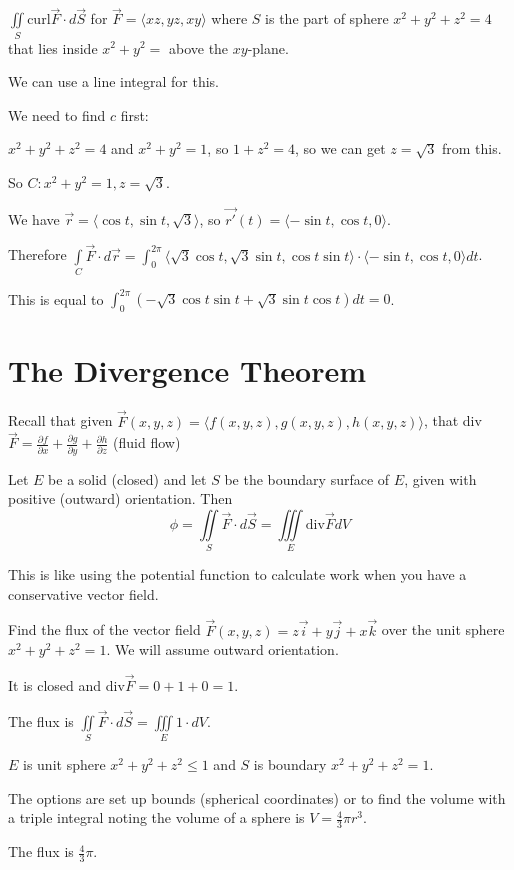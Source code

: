 \documentclass[../calc3.tex]{subfiles}
\begin{document}
\begin{example}
    $\iint\limits_{S}\text{curl}\vec{F}\cdot d\vec{S}$ for $\vec{F}=\langle xz,yz,xy\rangle$ where $S$ is the part of sphere $x^2+y^2+z^2=4$ that lies inside $x^2+y^2=$ above the $xy$-plane.

    We can use a line integral for this.

    We need to find $c$ first:

    $x^2+y^2+z^2=4$ and $x^2+y^2=1$, so $1+z^2=4$, so we can get $z=\sqrt{3}$ from this.

    So $C: x^2+y^2=1, z=\sqrt{3}$.

    We have $\vec{r}=\langle \cos t,\sin t,\sqrt{3}\rangle$, so $\vec{r'}(t)=\langle -\sin t,\cos t,0\rangle$.

    Therefore $\int\limits_{C}\vec{F}\cdot d\vec{r}=\int_0^{2\pi}\langle \sqrt{3}\cos t,\sqrt{3}\sin t,\cos t\sin t\rangle\cdot \langle -\sin t, \cos t,0\rangle dt$.

    This is equal to $\int_0^{2\pi}(-\sqrt{3}\cos t\sin t+\sqrt{3}\sin t\cos t)dt = 0$.
\end{example}

\section{The Divergence Theorem}
Recall that given $\vec{F}(x,y,z)=\langle f(x,y,z), g(x,y,z), h(x,y,z)\rangle$, that div$\vec{F}=\frac{\partial f}{\partial x}+\frac{\partial g}{\partial y}+\frac{\partial h}{\partial z}$ (fluid flow)

\begin{theorem}
    Let $E$ be a solid (closed) and let $S$ be the boundary surface of $E$, given with positive (outward) orientation. Then 
    \[ \phi = \iint\limits_{S}\vec{F}\cdot d\vec{S}=\iiint\limits_{E}\text{div}\vec{F}dV \]

    This is like using the potential function to calculate work when you have a conservative vector field.
\end{theorem}

\pagebreak
\begin{example}
    Find the flux of the vector field $\vec{F}(x,y,z)=z\vec{i}+y\vec{j}+x\vec{k}$ over the unit sphere $x^2+y^2+z^2=1$. We will assume outward orientation.

    It is closed and div$\vec{F}=0+1+0=1$.

    The flux is $\iint\limits_{S}\vec{F}\cdot d\vec{S}=\iiint\limits_{E}1\cdot dV$.

    $E$ is unit sphere $x^2+y^2+z^2\leq 1$ and $S$ is boundary $x^2+y^2+z^2=1$.

    The options are set up bounds (spherical coordinates) or to find the volume with a triple integral noting the volume of a sphere is $V=\frac{4}{3}\pi r^3$.

    The flux is $\frac{4}{3}\pi$.
\end{example}
\end{document}
